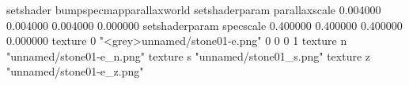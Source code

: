 setshader bumpspecmapparallaxworld
setshaderparam parallaxscale 0.004000 0.004000 0.004000 0.000000
setshaderparam specscale 0.400000 0.400000 0.400000 0.000000
texture 0 "<grey>unnamed/stone01-e.png" 0 0 0 1
texture n "unnamed/stone01-e_n.png"
texture s "unnamed/stone01_s.png"
texture z "unnamed/stone01-e_z.png"